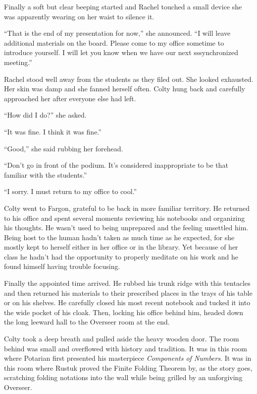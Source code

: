 Finally a soft but clear beeping started and Rachel touched a small device she was apparently
wearing on her waist to silence it.

``That is the end of my presentation for now,'' she announced. ``I will leave additional
materials on the board. Please come to my office sometime to introduce yourself. I will let you
know when we have our next sssynchronized meeting.''

Rachel stood well away from the students as they filed out. She looked exhausted. Her skin was
damp and she fanned herself often. Colty hung back and carefully approached her after everyone
else had left.

``How did I do?'' she asked.

``It was fine. I think it was fine.''

``Good,'' she said rubbing her forehead.

``Don't go in front of the podium. It's considered inappropriate to be that familiar with the
students.''

``I sorry. I must return to my office to cool.''

\spacebreak

Colty went to Fargon, grateful to be back in more familiar territory. He returned to his office
and spent several moments reviewing his notebooks and organizing his thoughts. He wasn't used to
being unprepared and the feeling unsettled him. Being host to the human hadn't taken as much
time as he expected, for she mostly kept to herself either in her office or in the library. Yet
because of her class he hadn't had the opportunity to properly meditate on his work and he found
himself having trouble focusing.

Finally the appointed time arrived. He rubbed his trunk ridge with this tentacles and then
returned his materials to their prescribed places in the trays of his table or on his shelves.
He carefully closed his most recent notebook and tucked it into the wide pocket of his cloak.
Then, locking his office behind him, headed down the long leeward hall to the Overseer room at
the end.

Colty took a deep breath and pulled aside the heavy wooden door. The room behind was small and
overflowed with history and tradition. It was in this room where Potarian first presented his
masterpiece \textit{Components of Numbers}. It was in this room where Rustuk proved the Finite
Folding Theorem by, as the story goes, scratching folding notations into the wall while being
grilled by an unforgiving Overseer.

